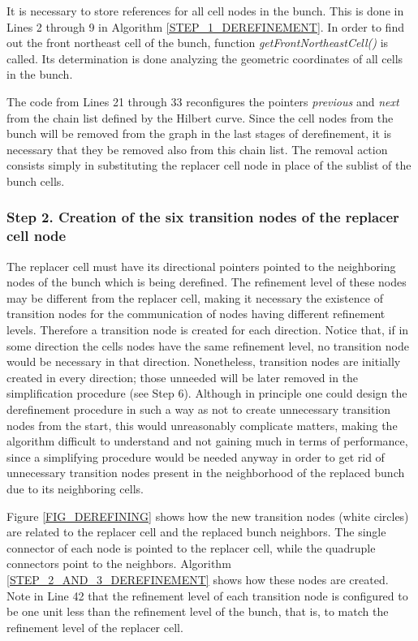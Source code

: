 It is necessary to store references for all cell nodes in the bunch.
This is done in Lines 2 through 9 in Algorithm
\ref{STEP_1_DEREFINEMENT}. In order to find out the front northeast
cell of the bunch, function \textit{getFrontNortheastCell()} is
called. Its determination is done analyzing the geometric
coordinates of all cells in the bunch.

The code from Lines 21 through 33 reconfigures the pointers
\textit{previous} and \textit{next} from the chain list defined by
the Hilbert curve. Since the cell nodes from the bunch will be
removed from the graph in the last stages of derefinement, it is
necessary that they be removed also from this chain list. The
removal action consists simply in substituting the replacer cell
node in place of the sublist of the bunch cells.

\subsubsection*{Step 2. Creation of the six transition nodes of the replacer cell node}
The replacer cell must have its directional pointers pointed to the
neighboring nodes of the bunch which is being derefined.  The
refinement level of these nodes may be different from the replacer
cell, making it necessary the existence of transition nodes for the
communication of nodes having different refinement levels. Therefore
a transition node is created for each direction. Notice that, if in
some direction the cells nodes have the same refinement level, no
transition node would be necessary in that direction. Nonetheless,
transition nodes are initially created in every direction; those
unneeded will be later removed in the simplification procedure (see
Step 6). Although in principle one could design the derefinement
procedure in such a way as not to create unnecessary transition
nodes from the start, this would unreasonably complicate matters,
making the algorithm difficult to understand and not gaining much in
terms of performance, since a simplifying procedure would be needed
anyway in order to get rid of unnecessary transition nodes present
in the neighborhood of the replaced bunch due to its neighboring
cells.

Figure \ref{FIG_DEREFINING} shows how the new transition nodes
(white circles) are related to the replacer cell and the replaced
bunch neighbors. The single connector of each node is pointed to the
replacer cell, while the quadruple connectors point to the
neighbors. Algorithm \ref{STEP_2_AND_3_DEREFINEMENT} shows how these
nodes are created. Note in Line 42 that the refinement level of each
transition node is configured to be one unit less than the
refinement level of the bunch, that is, to match the refinement
level of the replacer cell.


